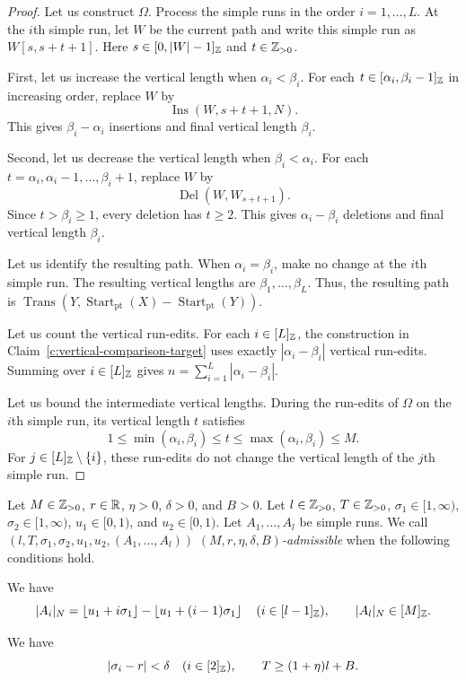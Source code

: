 \begin{proof}
 Let us construct $\Omega$.
Process the simple runs in the order $i=1,\ldots,L$.
At the $i$th simple run, let $W$ be the current path and write this simple run as $W[s,s+t+1]$.
Here $s\in[0,|W|-1]_{\mathbb Z}$ and $t\in\mathbb Z_{>0}$.

First, let us increase the vertical length when $\alpha_i<\beta_i$.
For each $t\in[\alpha_i,\beta_i-1]_{\mathbb Z}$ in increasing order, replace $W$ by
\[
 \operatorname{Ins}(W,s+t+1,N).
\]
This gives $\beta_i-\alpha_i$ insertions and final vertical length $\beta_i$.

Second, let us decrease the vertical length when $\beta_i<\alpha_i$.
For each $t=\alpha_i,\alpha_i-1,\ldots,\beta_i+1$, replace $W$ by
\[
 \operatorname{Del}(W,W_{s+t+1}).
\]
Since $t>\beta_i\ge1$, every deletion has $t\ge2$.
This gives $\alpha_i-\beta_i$ deletions and final vertical length $\beta_i$.

Let us identify the resulting path.
When $\alpha_i=\beta_i$, make no change at the $i$th simple run.
The resulting vertical lengths are $\beta_1,\ldots,\beta_L$.
Thus, the resulting path is $\operatorname{Trans}(Y,\operatorname{Start}_{\mathrm{pt}}(X)-\operatorname{Start}_{\mathrm{pt}}(Y))$.

 Let us count the vertical run-edits.
For each $i\in[L]_{\mathbb Z}$, the construction in Claim~\ref{c:vertical-comparison-target} uses exactly $|\alpha_i-\beta_i|$ vertical run-edits. Summing over $i\in[L]_{\mathbb Z}$ gives $n=\sum_{i=1}^L|\alpha_i-\beta_i|$.

 Let us bound the intermediate vertical lengths.
During the run-edits of $\Omega$ on the $i$th simple run, its vertical length $t$ satisfies
\[
 1\le\min(\alpha_i,\beta_i)\le t\le\max(\alpha_i,\beta_i)\le M.
\]
For $j\in[L]_{\mathbb Z}\setminus\{i\}$, these run-edits do not change the vertical length of the $j$th simple run.
\end{proof}

\begin{definition}\label{def:admissible-mechanical}
Let $M\in\mathbb Z_{>0}$, $r\in\mathbb R$, $\eta>0$, $\delta>0$, and $B>0$.
Let $l\in\mathbb Z_{>0}$, $T\in\mathbb Z_{>0}$, $\sigma_1\in[1,\infty)$, $\sigma_2\in[1,\infty)$,
$u_1\in[0,1)$, and $u_2\in[0,1)$. Let $A_1,\ldots,A_l$ be simple runs.
We call $(l,T,\sigma_1,\sigma_2,u_1,u_2,(A_1,\ldots,A_l))$
\textit{$(M,r,\eta,\delta,B)$-admissible} when the following conditions hold.
\begin{hypotheses}
\item\label{hyp:mechanical-source} We have
\[
 |A_i|_N=\left\lfloor u_1+i\sigma_1\right\rfloor-\left\lfloor u_1+(i-1)\sigma_1\right\rfloor
 \quad(i\in[l-1]_{\mathbb Z}),\qquad |A_l|_N\in[M]_{\mathbb Z}.
\]
\item\label{hyp:mechanical-proximity} We have
\[
 |\sigma_i-r|<\delta\quad(i\in[2]_{\mathbb Z}),\qquad T\ge(1+\eta)l+B.
\]
\end{hypotheses}
\end{definition}

